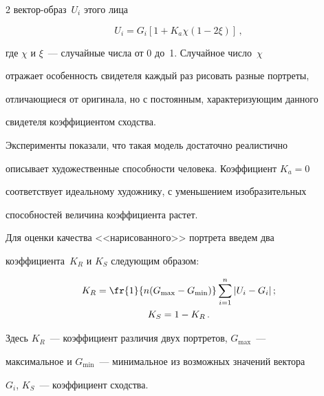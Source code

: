 \begin{multicols}{2}
век\-тор-об\-раз~$U_i$ этого лица





\noindent


     \begin{equation}


     U_i = G_i\left[1+K_a \chi \left(1-2\xi\right)\right]\,,


     \label{e1pr}


     \end{equation}


     где $\chi$ и $\xi$~--- случайные числа от 0 до~1. Случайное число~$\chi$ 


отражает особенность свидетеля каждый раз рисовать разные портреты, 


отличающиеся от оригинала, но с постоянным, характеризующим данного 


свидетеля коэффициентом сходства. 


     


     Эксперименты показали, что такая модель достаточно реалистично 


описывает художественные способности человека. Коэффициент $K_a=0$ 


соответствует идеальному художнику, с уменьшением изобразительных 


способностей величина коэффициента растет. 


     


     Для оценки качества <<нарисованного>> портрета введем два 


коэффициента~$K_R$ и $K_S$ следующим образом:


     \begin{gather}


     K_R = \fr{1}{n(G_{\max}-G_{\min})}\sum\limits_{i=1}^n\vert U_i-


G_i\vert\,; \label{e2pr}\\


     K_S=1-K_R\,.\label{e3pr}


     \end{gather}


     Здесь $K_R$~--- коэффициент различия двух портретов, $G_{\max}$~--- 


максимальное и $G_{\min}$~--- минимальное из возможных значений вектора 


$G_i$, $K_S$~--- коэффициент сходства.



\end{multicols}
